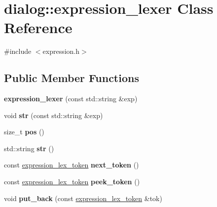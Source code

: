 \hypertarget{classdialog_1_1expression__lexer}{}\section{dialog\+:\+:expression\+\_\+lexer Class Reference}
\label{classdialog_1_1expression__lexer}


{\ttfamily \#include $<$expression.\+h$>$}

\subsection*{Public Member Functions}
\begin{DoxyCompactItemize}
\item 
\mbox{\label{classdialog_1_1expression__lexer_a19dbd63a6fb6c87b66bde397bca5c875}} 
{\bfseries expression\+\_\+lexer} (const std\+::string \&exp)
\item 
\mbox{\label{classdialog_1_1expression__lexer_a0b5966eb1b0f0d3d5f3e40c0fdd3d868}} 
void {\bfseries str} (const std\+::string \&exp)
\item 
\mbox{\label{classdialog_1_1expression__lexer_a64a4ab732ed88c5139f59f261a7e4aac}} 
size\+\_\+t {\bfseries pos} ()
\item 
\mbox{\label{classdialog_1_1expression__lexer_aa3a15848d2562dc6901adfdc0aaf42ae}} 
std\+::string {\bfseries str} ()
\item 
\mbox{\label{classdialog_1_1expression__lexer_ac76253b8c049a7e6899acc765be9c9b4}} 
const \hyperlink{structdialog_1_1expression__lex__token}{expression\+\_\+lex\+\_\+token} {\bfseries next\+\_\+token} ()
\item 
\mbox{\label{classdialog_1_1expression__lexer_a4810e4e4090270c369784a431bde614a}} 
const \hyperlink{structdialog_1_1expression__lex__token}{expression\+\_\+lex\+\_\+token} {\bfseries peek\+\_\+token} ()
\item 
\mbox{\label{classdialog_1_1expression__lexer_a40cf6a7ea967e8abeb2dbc23f4e76aed}} 
void {\bfseries put\+\_\+back} (const \hyperlink{structdialog_1_1expression__lex__token}{expression\+\_\+lex\+\_\+token} \&tok)
\end{DoxyCompactItemize}
